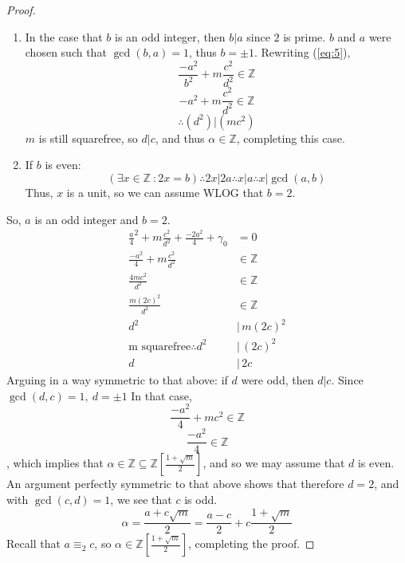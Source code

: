 \documentclass{article}
\newcommand{\Z}{\mathbb{Z}}
\begin{document}
\begin{proof}
\begin{enumerate}[C{a}se 1]
	\item In the case that $b$ is an odd integer, then $b|a$ since $2$ is prime.  $b$ and $a$ were chosen such that $\gcd(b,a)=1$, thus $b=\pm1$.  Rewriting (\ref{eq:5}),
	$$\frac{-a^2}{b^2}+m\frac{c^2}{d^2}\in\Z$$
	$$-a^2+m\frac{c^2}{d^2}\in\Z$$
	$$\therefore (d^2)|(mc^2)$$ $m$ is still squarefree, so $d|c$, and thus $\alpha\in\Z$, completing this case.
	\item If $b$ is even: $$(\exists x\in\Z\::2x=b)\therefore 2x|2a\therefore x|a\therefore x|\gcd(a,b)$$Thus, $x$ is a unit, so we can assume WLOG that $b=2$.  
	\end{enumerate}
So, $a$ is an odd integer and $b=2$.
\begin{align*}
\frac{a}{4}^2+m\frac{c^2}{d^2}+\frac{-2a^2}{4}+\gamma_0&=0\\
\frac{-a^2}{4}+m\frac{c^2}{d^2}&\in\Z\\
\frac{4mc^2}{d^2}&\in\Z\\
\frac{m(2c)^2}{d^2}&\in\Z\\
d^2 &|\,m(2c)^2\\
\text{m squarefree}\therefore d^2 &|\,(2c)^2\\
d\,&|\,2c
\end{align*}
Arguing in a way symmetric to that above: if $d$ were odd, then $d|c$.  Since $\gcd(d,c)=1,\ d=\pm1$  In that case, $$\frac{-a^2}{4}+mc^2\in\Z$$
$$\frac{-a^2}{4}\in\Z$$, which implies that $\alpha\in\Z\subseteq\Z[\frac{1+\sqrt{m}}{2}]$, and so we may assume that $d$ is even.  An argument perfectly symmetric to that above shows that therefore $d=2$, and with $\gcd(c,d)=1$, we see that $c$ is odd.
$$\alpha=\frac{a+c\sqrt{m}}{2}=\frac{a-c}{2}+c\frac{1+\sqrt{m}}{2}$$Recall that $a\equiv_2 c$, so $\alpha\in\Z[\frac{1+\sqrt{m}}{2}]$, completing the proof.
\end{proof}
\end{document}
